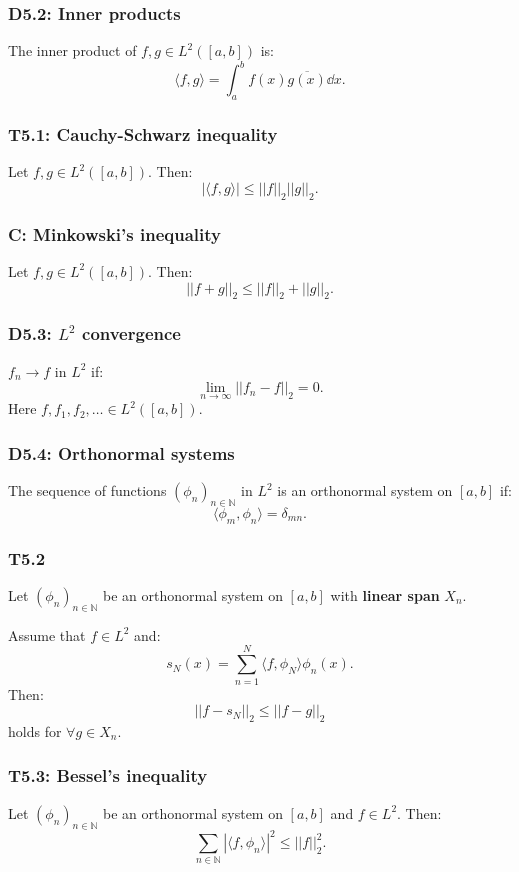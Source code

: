 \documentclass{article}
\begin{document}
\begin{multicols*}{3}
\subsubsection*{D5.2: Inner products}
The inner product of $f,g\in L^2([a,b])$ is:
$$\langle f,g\rangle=
\int_{a}^{b}f(x)\overline{g(x)}\dd x.$$

\subsubsection*{T5.1: Cauchy-Schwarz inequality}
Let $f,g\in L^2([a,b])$. Then:
$$|\langle f,g\rangle|\leq||f||_2||g||_2.$$

\subsubsection*{C: Minkowski's inequality}
Let $f,g\in L^2([a,b])$. Then:
$$||f+g||_2\leq||f||_2+||g||_2.$$

\subsubsection*{D5.3: $L^2$ convergence}
$f_n\rightarrow f$ in $L^2$ if:
$$\lim_{n\rightarrow\infty}||f_n-f||_2=0.$$
Here $f,f_1,f_2,\ldots\in L^2([a,b])$.

\subsubsection*{D5.4: Orthonormal systems}
The sequence of functions $(\phi_n)_{n\in\mathbb{N}}$ 
in $L^2$ is an orthonormal system on $[a,b]$ if:
$$\langle\phi_m,\phi_n \rangle=\delta_{mn}.$$

\subsubsection*{T5.2}
Let $(\phi_n)_{n\in\mathbb{N}}$ be an
orthonormal system on $[a,b]$ with
\textbf{linear span} $X_n$. 

Assume that $f\in L^2$ and:
$$s_N(x)=\sum_{n=1}^{N}
\langle f,\phi_N\rangle\phi_n(x).$$
Then:
$$||f-s_N||_2\leq||f-g||_2$$
holds for $\forall g\in X_n$.

\subsubsection*{T5.3: Bessel's inequality}
Let $(\phi_n)_{n\in\mathbb{N}}$ be an
orthonormal system on $[a,b]$ and $f\in L^2$.
Then:
$$\sum_{n\in\mathbb{N}}|
\langle f,\phi_n\rangle|^2
\leq||f||_2^2.$$


\end{multicols*}
\end{document}
